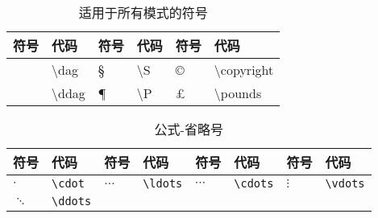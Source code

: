 \documentclass[UTF8,fontset=ubuntu]{ctexart}
\begin{document}
\begin{table}[H]
\begin{tabular}{l l l l l l}
	\hline
	符号 & 代码 & 符号 & 代码 & 符号 & 代码\\
	\hline
	\dag & \textbackslash  dag & \S & \textbackslash  S & \copyright & \textbackslash  copyright\\
	\ddag & \textbackslash  ddag & \P & \textbackslash  P & \pounds & \textbackslash  pounds\\
	\hline
\end{tabular}
\caption{适用于所有模式的符号}
\end{table}

\begin{table}[H]
\begin{minipage}{\textwidth}
\begin{tabular}{l l l l l l l l}
	\hline
	符号 & 代码 & 符号 & 代码 & 符号 & 代码 & 符号 & 代码\\
	\hline
	$\cdot$ & \verb+\cdot+ & $\ldots$ & \verb+\ldots+\footnotemark[1] & $\cdots$ & \verb+\cdots+ & $\vdots$ & \verb+\vdots+\footnotemark[1]\\
	$\ddots$ & \verb+\ddots+\\
	\hline
\end{tabular}
\end{minipage}
\caption{公式-省略号}
\end{table}
\end{document}
